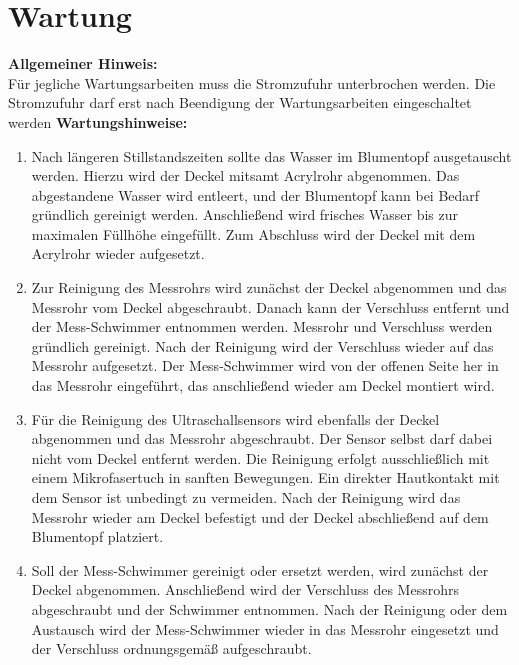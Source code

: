 %
%
%

\chapter{Wartung}
	\textbf{Allgemeiner Hinweis:}\\
	Für jegliche Wartungsarbeiten muss die Stromzufuhr unterbrochen werden. Die Stromzufuhr darf erst nach Beendigung der Wartungsarbeiten eingeschaltet werden 
	\textbf{Wartungshinweise:}
	\begin{enumerate}
		\item Nach längeren Stillstandszeiten sollte das Wasser im Blumentopf ausgetauscht werden. Hierzu wird der Deckel mitsamt Acrylrohr abgenommen. Das abgestandene Wasser wird entleert, und der Blumentopf kann bei Bedarf gründlich gereinigt werden. Anschließend wird frisches Wasser bis zur maximalen Füllhöhe eingefüllt. Zum Abschluss wird der Deckel mit dem Acrylrohr wieder aufgesetzt.
		\item Zur Reinigung des Messrohrs wird zunächst der Deckel abgenommen und das Messrohr vom Deckel abgeschraubt. Danach kann der Verschluss entfernt und der Mess-Schwimmer entnommen werden. Messrohr und Verschluss werden gründlich gereinigt. Nach der Reinigung wird der Verschluss wieder auf das Messrohr aufgesetzt. Der Mess-Schwimmer wird von der offenen Seite her in das Messrohr eingeführt, das anschließend wieder am Deckel montiert wird.
		\item Für die Reinigung des Ultraschallsensors wird ebenfalls der Deckel abgenommen und das Messrohr abgeschraubt. Der Sensor selbst darf dabei nicht vom Deckel entfernt werden. Die Reinigung erfolgt ausschließlich mit einem Mikrofasertuch in sanften Bewegungen. Ein direkter Hautkontakt mit dem Sensor ist unbedingt zu vermeiden. Nach der Reinigung wird das Messrohr wieder am Deckel befestigt und der Deckel abschließend auf dem Blumentopf platziert.
		\item Soll der Mess-Schwimmer gereinigt oder ersetzt werden, wird zunächst der Deckel abgenommen. Anschließend wird der Verschluss des Messrohrs abgeschraubt und der Schwimmer entnommen. Nach der Reinigung oder dem Austausch wird der Mess-Schwimmer wieder in das Messrohr eingesetzt und der Verschluss ordnungsgemäß aufgeschraubt.
	\end{enumerate}
	 


